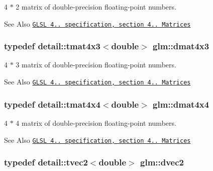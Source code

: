 4 $\ast$ 2 matrix of double-\/precision floating-\/point numbers. 

\begin{DoxySeeAlso}{See Also}
\href{http://www.opengl.org/registry/doc/GLSLangSpec.4.20.8.pdf}{\tt G\-L\-S\-L 4.. specification, section 4.. Matrices} 
\end{DoxySeeAlso}
\hypertarget{group__core__types_ga47f7b642f84d1272a0dafa221c8fd720}{
\subsubsection[{dmat4x3}]{\setlength{\rightskip}{0pt plus 5cm}typedef detail\-::tmat4x3$<$double$>$ {\bf glm\-::dmat4x3}}}\label{group__core__types_ga47f7b642f84d1272a0dafa221c8fd720}


4 $\ast$ 3 matrix of double-\/precision floating-\/point numbers. 

\begin{DoxySeeAlso}{See Also}
\href{http://www.opengl.org/registry/doc/GLSLangSpec.4.20.8.pdf}{\tt G\-L\-S\-L 4.. specification, section 4.. Matrices} 
\end{DoxySeeAlso}
\hypertarget{group__core__types_gaa505ead5e0b6d8bc504ccfeadbac83d5}{
\subsubsection[{dmat4x4}]{\setlength{\rightskip}{0pt plus 5cm}typedef detail\-::tmat4x4$<$double$>$ {\bf glm\-::dmat4x4}}}\label{group__core__types_gaa505ead5e0b6d8bc504ccfeadbac83d5}


4 $\ast$ 4 matrix of double-\/precision floating-\/point numbers. 

\begin{DoxySeeAlso}{See Also}
\href{http://www.opengl.org/registry/doc/GLSLangSpec.4.20.8.pdf}{\tt G\-L\-S\-L 4.. specification, section 4.. Matrices} 
\end{DoxySeeAlso}
\hypertarget{group__core__types_gad9953f484cbb104e8675653ce61900cb}{
\subsubsection[{dvec2}]{\setlength{\rightskip}{0pt plus 5cm}typedef detail\-::tvec2$<$double$>$ {\bf glm\-::dvec2}}}\label{group__core__types_gad9953f484cbb104e8675653ce61900cb}


